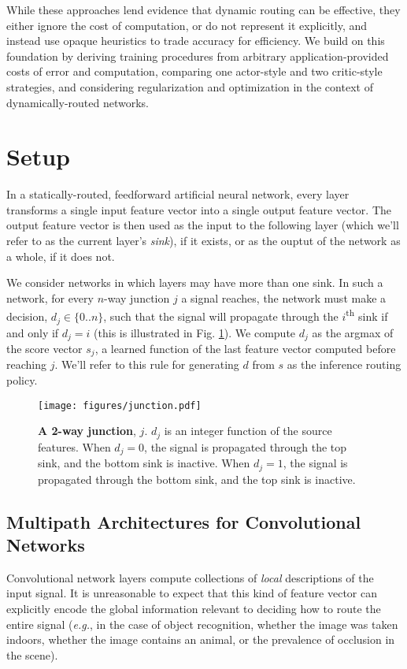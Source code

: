 \documentclass{article}
\begin{document}
  While these approaches lend evidence that dynamic routing can be effective, they either ignore the cost of computation, or do not represent it explicitly, and instead use opaque heuristics to trade accuracy for efficiency. We build on this foundation by deriving training procedures from arbitrary application-provided costs of error and computation, comparing one actor-style and two critic-style strategies, and considering regularization and optimization in the context of dynamically-routed networks.

  \section{Setup}
  
  In a statically-routed, feedforward artificial neural network, every layer transforms a single input feature vector into a single output feature vector. The output feature vector is then used as the input to the following layer (which we'll refer to as the current layer's \textit{sink}), if it exists, or as the ouptut of the network as a whole, if it does not.
  
  We consider networks in which layers may have more than one sink. In such a network, for every $n$-way junction $j$ a signal reaches, the network must make a decision, $d_j \in \{0..n\}$, such that the signal will propagate through the $i$\textsuperscript{th} sink if and only if $d_j = i$ (this is illustrated in Fig. \ref*{fig:junction}). We compute $d_j$ as the argmax of the score vector $s_j$, a learned function of the last feature vector computed before reaching $j$. We'll refer to this rule for generating $d$ from $s$ as the inference routing policy.
  
  \begin{figure}[htb]
    \centering
    \texttt{[image: figures/junction.pdf]}
    \caption{\textbf{A 2-way junction}, $j$. $d_j$ is an integer function of the source features. When $d_j=0$, the signal is propagated through the top sink, and the bottom sink is inactive. When $d_j=1$, the signal is propagated through the bottom sink, and the top sink is inactive.}
    \label{fig:junction}
  \end{figure}
  
  \subsection{Multipath Architectures for Convolutional Networks}
  
  Convolutional network layers compute collections of \textit{local} descriptions of the input signal. It is unreasonable to expect that this kind of feature vector can explicitly encode the global information relevant to deciding how to route the entire signal (\textit{e.g.}, in the case of object recognition, whether the image was taken indoors, whether the image contains an animal, or the prevalence of occlusion in the scene).
  
\end{document}
